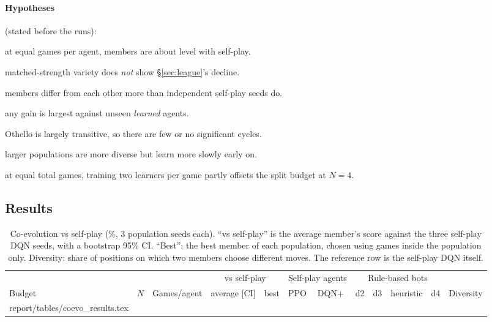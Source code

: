 \documentclass[11pt]{article}
\makeatletter
\newcommand{\tabinput}[1]{\@@input #1 }
\makeatother
\begin{document}
\paragraph{Hypotheses} (stated before the runs):
\begin{description}[leftmargin=1.2em,style=nextline,itemsep=2pt]
  \item[H1:] at equal games per agent, members are about level with self-play.
  \item[H2:] matched-strength variety does \emph{not} show \S\ref{sec:league}'s
        decline.
  \item[H3:] members differ from each other more than independent self-play
        seeds do.
  \item[H4:] any gain is largest against unseen \emph{learned} agents.
  \item[H5:] Othello is largely transitive, so there are few or no
        significant cycles.
  \item[H6:] larger populations are more diverse but learn more slowly early
        on.
  \item[H7:] at equal total games, training two learners per game partly
        offsets the split budget at $N=4$.
\end{description}

\subsection{Results}

\begin{table}[H]
\centering
\caption{Co-evolution vs self-play (\%, 3 population seeds each). ``vs self-play''
is the average member's score against the three self-play DQN seeds, with a
bootstrap 95\% CI. ``Best'': the best member of each population, chosen using
games inside the population only. Diversity: share of positions on which two
members choose different moves. The reference row is the self-play DQN itself.}
\label{tab:coevo}
\scriptsize
\setlength{\tabcolsep}{3pt}
\begin{tabular}{@{}lrrllllllll l@{}}
\toprule
& & & \multicolumn{2}{c}{vs self-play} & \multicolumn{2}{c}{Self-play agents} & \multicolumn{4}{c}{Rule-based bots} & \\
\cmidrule(lr){4-5}\cmidrule(lr){6-7}\cmidrule(lr){8-11}
Budget & $N$ & Games/agent & average [CI] & best & PPO & DQN+ & d2 & d3 & heuristic & d4 & Diversity \\
\midrule
\tabinput{report/tables/coevo_results.tex}
\bottomrule
\end{tabular}
\end{table}
\end{document}

